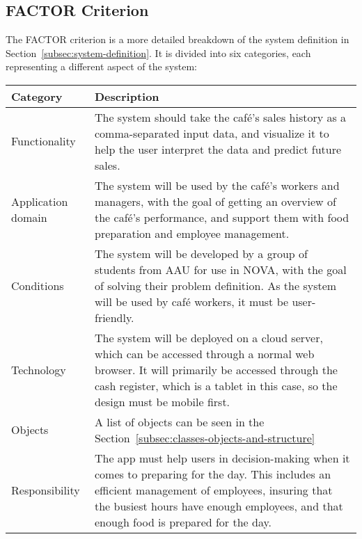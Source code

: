 \subsection{FACTOR Criterion}\label{subsec:factor-criterion}

The FACTOR criterion is a more detailed breakdown of the system definition in Section~\ref{subsec:system-definition}.
It is divided into six categories, each representing a different aspect of the system:

\begin{tabular}{ m{2.5cm} m{10cm} }
    \toprule
    \textbf{Category} & \textbf{Description}
    \\ \midrule
    Functionality
    & The system should take the café's sales history as a comma-separated input data, and visualize it to
    help the user interpret the data and predict future sales.
    \\ \midrule
    Application domain
    & The system will be used by the café's workers and managers, with the goal of getting an
    overview of the café's performance, and support them with food preparation and employee management.
    \\ \midrule
    Conditions
    & The system will be developed by a group of students from AAU for use in NOVA, with the goal of solving
    their problem definition.
    As the system will be used by café workers, it must be user-friendly.
    \\ \midrule
    Technology
    & The system will be deployed on a cloud server, which can be accessed through a normal web browser.
    It will primarily be accessed through the cash register, which is a tablet in this case, so the design must be
    mobile first.
    \\ \midrule
    Objects
    & A list of objects can be seen in the Section~\ref{subsec:classes-objects-and-structure}
    \\ \midrule
    Responsibility
    & The app must help users in decision-making when it comes to preparing for the day.
    This includes an efficient management of employees, insuring that the busiest hours have enough employees, and
    that enough food is prepared for the day.
    \\ \bottomrule
\end{tabular}
